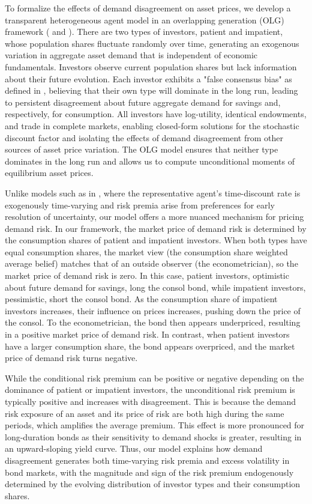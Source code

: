 \documentclass[preprint,11pt,authoryear]{elsarticle}
\theoremstyle{plain}
\begin{document}
To formalize the effects of demand disagreement on asset prices, we develop a transparent heterogeneous agent model in an overlapping generation (OLG) framework (\cite{Blanchard2013} and \cite{Garleanu2008}). There are two types of investors, patient and impatient, whose population shares fluctuate randomly over time, generating an exogenous variation in aggregate asset demand that is independent of economic fundamentals. Investors observe current population shares but lack information about their future evolution. Each investor exhibits a "false consensus bias" as defined in \cite{RossGreenHouse77}, believing that their own type will dominate in the long run, leading to persistent disagreement about future aggregate demand for savings and, respectively, for consumption. All investors have log-utility, identical endowments, and trade in complete markets, enabling closed-form solutions for the stochastic discount factor and isolating the effects of demand disagreement from other sources of asset price variation. The OLG model ensures that neither type dominates in the long run and allows us to compute unconditional moments of equilibrium asset prices.




Unlike models such as in \citep{ALBUQUERQUE2016}, where the representative agent's time-discount rate is exogenously time-varying and risk premia arise from preferences for early resolution of uncertainty, our model offers a more nuanced mechanism for pricing demand risk. In our framework, the market price of demand risk is determined by the consumption shares of patient and impatient investors. When both types have equal consumption shares, the market view (the consumption share weighted average belief) matches that of an outside observer (the econometrician), so the market price of demand risk is zero. In this case, patient investors, optimistic about future demand for savings, long the consol bond, while impatient investors, pessimistic, short the consol bond. As the consumption share of impatient investors increases, their influence on prices increases, pushing down the price of the consol. To the econometrician, the bond then appears underpriced, resulting in a positive market price of demand risk. In contrast, when patient investors have a larger consumption share, the bond appears overpriced, and the market price of demand risk turns negative.


While the conditional risk premium can be positive or negative depending on the dominance of patient or impatient investors, the unconditional risk premium is typically positive and increases with disagreement. This is because the demand risk exposure of an asset and its price of risk are both high during the same periods, which amplifies the average premium. This effect is more pronounced for long-duration bonds as their sensitivity to demand shocks is greater, resulting in an upward-sloping yield curve. Thus, our model explains how demand disagreement generates both time-varying risk premia and excess volatility in bond markets, with the magnitude and sign of the risk premium endogenously determined by the evolving distribution of investor types and their consumption shares.
\end{document}
